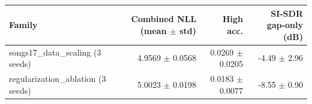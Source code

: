 \begin{tabular}{lrrr}
\toprule
Family & Combined NLL (mean $\pm$ std) & High acc. & SI-SDR gap-only (dB) \\
\midrule
songs17\_data\_scaling (3 seeds) & 4.9569 $\pm$ 0.0568 & 0.0269 $\pm$ 0.0205 & -4.49 $\pm$ 2.96 \\
regularization\_ablation (3 seeds) & 5.0023 $\pm$ 0.0198 & 0.0183 $\pm$ 0.0077 & -8.55 $\pm$ 0.90 \\
\bottomrule
\end{tabular}
